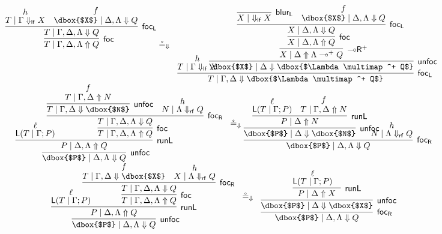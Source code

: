 \documentclass[runningheads]{llncs}
\newcommand{\lright}{{\multimap}\mathsf{R}}
\newcommand{\lolliR}{\lright}
\newcommand{\lolli}{\multimap}
\renewcommand{\L}{\mathsf{L}}
\newcommand{\lf}{\dn_\mathsf{lf}}%
\newcommand{\rf}{\dn_\mathsf{rf}}%
\newcommand{\proofbox}[1]{\begin{tabular}{l} #1 \end{tabular}}
\newcommand{\up}{\Uparrow}
\newcommand{\dn}{\Downarrow}
\newcommand{\focL}{\mathsf{foc_L}}
\newcommand{\foc}{\mathsf{foc}}
\newcommand{\focR}{\mathsf{foc_R}}
\newcommand{\blurL}{\mathsf{blur_L}}
\newcommand{\unfoc}{\mathsf{unfoc}}
\newcommand{\runL}{\mathsf{runL}}
\begin{document}
\begin{figure}[hbpt]
\[\begin{array}{c}
{{{      \infer[\foc]{T \mid \Gamma,\Delta,\Lambda \up Q}{
        \infer[\focL]{T \mid \Gamma , \Delta,\Lambda \dn Q}{
          \deduce{T \mid \Gamma \lf X}{h} &
          \deduce{\dbox{$X$} \mid \Delta,\Lambda \dn Q}{f}
        }
      }
    }
  }
}  \circeq_\dn 
\proofbox{
  \infer[\focL]{T \mid \Gamma,\Delta \dn \dbox{$\Lambda \lolli^+ Q$}}{
    \deduce{T \mid \Gamma \lf X}{h} &
    \hspace{-20pt}
    \infer[\unfoc]{\dbox{$X$} \mid \Delta \dn \dbox{$\Lambda \lolli^+ Q$}}{
      \infer[\lolliR^+]{X \mid \Delta \up \Lambda \lolli^+ Q}{
        \infer[\foc]{X \mid \Delta,\Lambda \up Q}{
          \infer[\focL]{X \mid \Delta,\Lambda \dn Q}{
            \infer[\blurL]{X \mid ~ \lf X}{} &
            \deduce{\dbox{$X$} \mid \Delta,\Lambda \dn Q}{f}
          }
        }
      }
    }
  }
}
\\[6pt]
\proofbox{
  \infer[\unfoc]{\dbox{$P$} \mid \Delta,\Lambda \dn Q}{
    \infer[\runL]{P \mid \Delta,\Lambda \up Q}{
      \deduce{\L(T\mid\Gamma;P)}{\ell} &
      \hspace{-20pt}
      \infer[\foc]{T \mid \Gamma,\Delta,\Lambda \up Q}{
        \infer[\focR]{T \mid \Gamma,\Delta,\Lambda \dn Q}{
          \infer[\unfoc]{T \mid \Gamma,\Delta \dn \dbox{$N$}}{
            \deduce{T \mid \Gamma,\Delta \up N}{f}
          }
          &        
          \deduce{N \mid \Lambda \rf Q}{h}
        }
      }
    }
  }
}
\circeq_\dn
\hspace{-6pt}
\proofbox{
  \infer[\focR]{\dbox{$P$} \mid \Delta,\Lambda \dn Q}{
    \infer[\unfoc]{\dbox{$P$} \mid \Delta \dn \dbox{$N$}}{
      \infer[\runL]{P \mid \Delta \up N}{
        \deduce{\L(T\mid\Gamma;P)}{\ell} &        
        \deduce{T \mid \Gamma,\Delta \up N}{f}
      }
    }
    &
    \hspace{-20pt}
    \deduce{N \mid \Lambda \rf Q}{h}
  }
}
\\[6pt]
\proofbox{
  \infer[\unfoc]{\dbox{$P$} \mid \Delta,\Lambda \dn Q}{
    \infer[\runL]{P \mid \Delta,\Lambda \up Q}{
      \deduce{\L(T\mid\Gamma;P)}{\ell} &
      \hspace{-20pt}
      \infer[\foc]{T \mid \Gamma,\Delta,\Lambda \up Q}{
        \infer[\focR]{T \mid \Gamma,\Delta,\Lambda \dn Q}{
          \deduce{T \mid \Gamma,\Delta \dn \dbox{$X$}}{f}
          &
          \deduce{X \mid \Lambda \rf Q}{h}
        }
      }
    }
  }
}
\circeq_\dn
\proofbox{
  \infer[\focR]{\dbox{$P$} \mid \Delta,\Lambda \dn Q}{
    \infer[\unfoc]{\dbox{$P$} \mid \Delta \dn \dbox{$X$}}{
      \infer[\runL]{P \mid \Delta \up X}{
        \deduce{\L(T\mid\Gamma;P)}{\ell} &
}}}}
\end{array}\]
\end{figure}
\end{document}
